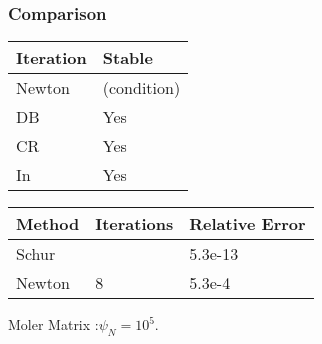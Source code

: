 
\begin{frame}
    \frametitle{Comparison}
    \begin{table}[]
        \begin{tabular}{ll}
            Iteration & Stable                           \\ \hline
            Newton    & \multicolumn{1}{|l}{(condition)} \\
            DB        & \multicolumn{1}{|l}{Yes}         \\
            CR        & \multicolumn{1}{|l}{Yes}         \\
            In        & \multicolumn{1}{|l}{Yes}        
        \end{tabular}
    \end{table}
    
    \begin{table}[]
        \begin{tabular}{lll}
            Method & Iterations             & Relative Error \\ \hline
            Schur  & \multicolumn{1}{|l}{}  & 5.3e-13        \\
            Newton & \multicolumn{1}{|l}{8} & 5.3e-4        
        \end{tabular}  
        \end{table}
        Moler Matrix :$\psi_N = 10^5 $.
\end{frame}

